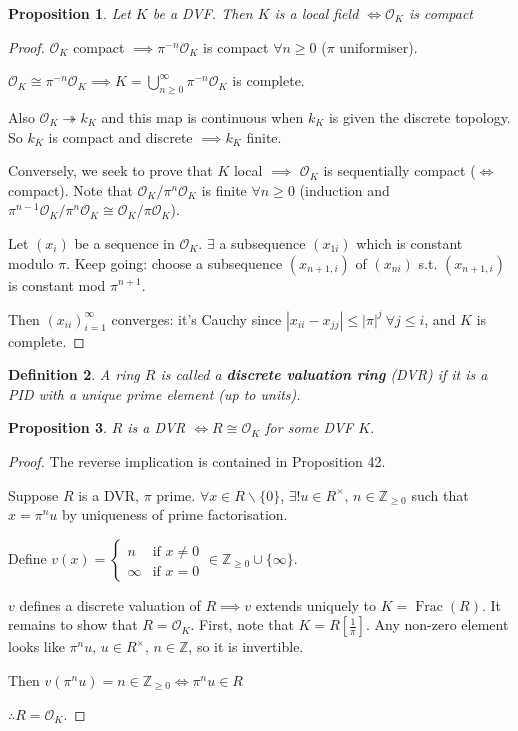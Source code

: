 \documentclass[a4paper]{article}
\newtheorem{definition}{Definition}
\newtheorem{prop}[definition]{Proposition}
\newcommand*\abs[1]{\left|#1\right|}
\DeclareMathOperator{\Frac}{Frac}
\begin{document}
\begin{prop}
	Let $K$ be a DVF.
	Then $K$ is a local field $\iff \mathcal{O}_K$ is compact 
\end{prop}
\begin{proof}
	$\mathcal{O}_K$ compact $\implies \pi^{-n}\mathcal{O}_K$ is compact $\forall n \geq 0$ ($\pi$ uniformiser).
	
	$\mathcal{O}_K \cong \pi^{-n}\mathcal{O}_K \implies K = \bigcup_{n \geq 0}^{\infty} \pi^{-n} \mathcal{O}_K$ is complete.
	
	Also $\mathcal{O}_K \twoheadrightarrow k_K$ and this map is continuous when $k_K$ is given the discrete topology.
	So $k_K$ is compact and discrete $\implies k_K$ finite.
	
	Conversely, we seek to prove that $K$ local $\implies$ $\mathcal{O}_K$ is sequentially compact ($\iff$ compact).
	Note that $\mathcal{O}_K/\pi^n\mathcal{O}_K$ is finite $\forall n \geq 0$ (induction and $\pi^{n-1}\mathcal{O}_K/\pi^n\mathcal{O}_K \cong \mathcal{O}_K/\pi\mathcal{O}_K$).
	
	Let $(x_i)$ be a sequence in $\mathcal{O}_K$.
	$\exists$ a subsequence $(x_{1i})$ which is constant modulo $\pi$.
	Keep going: choose a subsequence $(x_{n+1,i})$ of $(x_{ni})$ s.t. $(x_{n+1, i})$ is constant mod $\pi^{n+1}$.
	
	Then $(x_{ii})_{i=1}^\infty$ converges: it's Cauchy since $\abs{x_{ii}-x_{jj}} \leq \abs{\pi}^j\ \forall j \leq i$, and $K$ is complete.
\end{proof}

\begin{definition}
	A ring $R$ is called a \textbf{discrete valuation ring} (DVR) if it is a PID with a unique prime element (up to units).
\end{definition}

\begin{prop}
	$R$ is a DVR $\iff R \cong \mathcal{O}_K$ for some DVF $K$.
\end{prop}
\begin{proof}
	The reverse implication is contained in Proposition 42.
	
	Suppose $R$ is a DVR, $\pi$ prime.
	$\forall x \in R \backslash \{0\}$,
	$\exists! u \in R^\times,\, n \in \mathbb{Z}_{\geq 0}$ such that $x = \pi^n u$
	by uniqueness of prime factorisation.
	
	Define $v(x) = \begin{cases}
	n & \text{if } x \neq 0 \\
	\infty & \text{if } x = 0
	\end{cases}
	\in \mathbb{Z}_{\geq 0} \cup \{\infty\}$.
	
	$v$ defines a discrete valuation of $R \implies v$ extends uniquely to $K = \Frac(R)$.
	It remains to show that $R=\mathcal{O}_K$.
	First, note that $K=R[\frac{1}{\pi}]$.
	Any non-zero element looks like $\pi^nu,\,u\in R^\times,\, n \in \mathbb{Z}$,
	so it is invertible.
	
	Then $v(\pi^nu)=n \in \mathbb{Z}_{\geq 0} \iff \pi^nu \in R$
	
	$\therefore R = \mathcal{O}_K$.
\end{proof}
\end{document}
